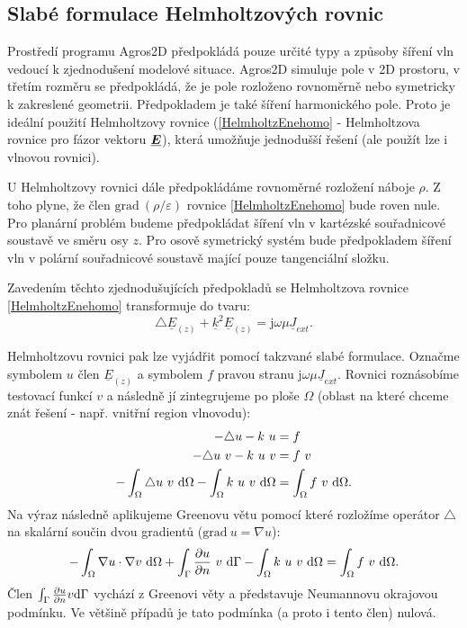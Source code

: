 \documentclass[12pt,a4paper,oneside]{article}
\numberwithin{equation}{section} %
\numberwithin{figure}{section} %
\numberwithin{table}{section} %
\newcommand{\mj}{\mathrm{j}} %
\renewcommand{\vec}[1]{\mbox{\boldmath$#1$}} %
\newcommand{\faz}[1]{{\underline{#1}}} %
\newcommand{\grad}{\mathrm{grad}\ }
\begin{document}
\subsection{Slabé formulace Helmholtzových rovnic}
\label{weakforms}
Prostředí programu Agros2D předpokládá pouze určité typy a způsoby šíření vln vedoucí k zjednodušení modelové situace. Agros2D simuluje pole v 2D prostoru, v třetím rozměru se předpokládá, že je pole rozloženo rovnoměrně nebo symetricky k zakreslené geometrii. Předpokladem je také šíření harmonického pole. Proto je ideální použití Helmholtzovy rovnice (\ref{HelmholtzEnehomo} - Helmholtzova rovnice pro fázor vektoru $\faz{\vec{E}}$), která umožňuje jednodušší řešení (ale použít lze i vlnovou rovnici).

U Helmholtzovy rovnici dále předpokládáme rovnoměrné rozložení náboje $\rho$. Z toho plyne, že člen $\grad \! \! (\rho / \varepsilon)$ rovnice \ref{HelmholtzEnehomo} bude roven nule. Pro planární problém budeme předpokládat šíření vln v kartézské souřadnicové soustavě ve směru osy $z$. Pro osově symetrický systém bude předpokladem šíření vln v polární souřadnicové soustavě mající pouze tangenciální složku.

Zavedením těchto zjednodušujících předpokladů se Helmholtzova rovnice \ref{HelmholtzEnehomo} transformuje do tvaru:
\begin{equation}
\label{HelmEasy}
\triangle \faz{E} _{(z)} + \faz{k} ^2 \faz{E} _{(z)} = \mj \omega \mu \faz{J} _{ext} .
\end{equation}

Helmholtzovu rovnici pak lze vyjádřit pomocí takzvané slabé formulace. Označme symbolem $u$ člen $\faz{E} _{(z)}$ a symbolem $f$ pravou stranu $\mj \omega \mu \faz{J} _{ext}$. Rovnici roznásobíme testovací funkcí $v$ a následně jí zintegrujeme po ploše $\Omega$ (oblast na které chceme znát řešení - např. vnitřní region vlnovodu):
\begin{subequations}
\label{Poisson}
\begin{align}
- \triangle u - k ~ u &= f
\\
- \triangle u ~ v - k ~ u ~ v &= f ~ v
\\
- \int _{\Omega} \triangle u ~ v ~ \mathrm{d} \Omega - \int _{\Omega} k ~ u ~ v ~ \mathrm{d} \Omega &= \int _{\Omega} f ~ v ~ \mathrm{d} \Omega .
\end{align}
\end{subequations}
Na výraz následně aplikujeme Greenovu větu pomocí které rozložíme operátor $\triangle$ na skalární součin dvou gradientů ($\grad u = \nabla u$):
\begin{equation}
\label{Green}
- \int _{\Omega} \nabla u \cdot \nabla v ~ \mathrm{d} \Omega + \int _{\Gamma} \frac{\partial u}{\partial n} ~ v ~ \mathrm{d} \Gamma - \int _{\Omega} k ~ u ~ v ~ \mathrm{d} \Omega = \int _{\Omega} f ~ v ~ \mathrm{d} \Omega .
\end{equation}
Člen $\int _{\Gamma} \frac{\partial u}{\partial n} v \mathrm{d} \Gamma$ vychází z Greenovi věty a představuje Neumannovu okrajovou podmínku. Ve většině případů je tato podmínka (a proto i tento člen) nulová.
\end{document}
